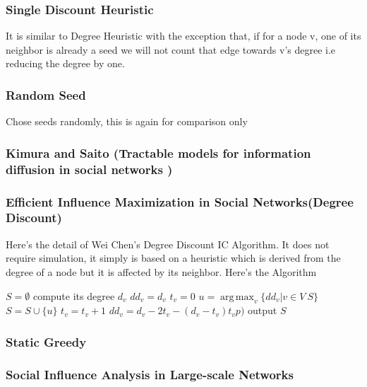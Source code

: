 \documentclass[english]{tktltiki}
\DeclareMathOperator*{\argmax}{arg\,max}
\begin{document}
\subsubsection{Single Discount Heuristic}
It is similar to Degree Heuristic with the exception that, if for a node v, one of its neighbor is already a seed we will not count that edge towards v's degree i.e reducing the degree by one.

\subsubsection{Random Seed}
Chose seeds randomly, this is again for comparison only

\subsubsection{Kimura and Saito (Tractable models for information diffusion in social networks )}

\subsubsection{Efficient Influence Maximization in Social Networks(Degree Discount)}
Here's the detail of Wei Chen's Degree Discount IC Algorithm. It does not require simulation, it simply is based on a heuristic which is derived from the degree of a node but it is affected by its neighbor. 
Here's the Algorithm \newline
\begin{algorithm}
\begin{algorithmic}
\State $S=\emptyset$
	\State compute its degree $d_v$
 	\State $dd_v=d_v$
 	\State $t_v = 0$
\EndFor
{}
	\State $u = \argmax_v \{dd_v |  v \in V \ S\}$
	\State $S = S \cup \{u\}$
		\State $t_v = t_v + 1$
		\State $dd_v = d_v - 2t_v - (d_v - t_v)t_v p)$
	\EndFor
\EndFor
\State output $S$
\end{algorithmic}
\end{algorithm}






\subsubsection{Static Greedy}

\subsubsection{Social Influence Analysis in Large-scale Networks}
\end{document}
